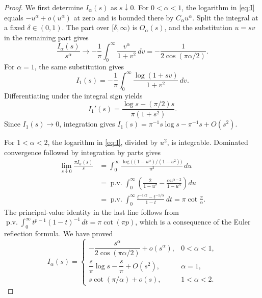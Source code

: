 \documentclass[11pt]{amsart}
\numberwithin{equation}{section}
\theoremstyle{remark}
\newcommand{\pv}{\operatorname{p.v.}}
\begin{document}
\begin{proof}
We first determine $I_\alpha(s)$ as $s\downarrow0$.  For $0<\alpha<1$,
the logarithm in \eqref{eq:I} equals $-u^\alpha+o(u^\alpha)$ at zero and is
bounded there by $C_\alpha u^\alpha$.  Split the integral at a fixed
$\delta\in(0,1)$.  The part over $[\delta,\infty)$ is $O_\alpha(s)$, and the
substitution $u=sv$ in the remaining part gives
\[
 \frac{I_\alpha(s)}{s^\alpha}\longrightarrow
 -\frac1\pi\int_0^\infty\frac{v^\alpha}{1+v^2}\,dv
 =-\frac1{2\cos(\pi\alpha/2)}.
\]
For $\alpha=1$, the same substitution gives
\[
 I_1(s)=-\frac1\pi\int_0^\infty
 \frac{\log(1+sv)}{1+v^2}\,dv.
\]
Differentiating under the integral sign yields
\[
 I_1'(s)=\frac{\log s-(\pi/2)s}{\pi(1+s^2)}.
\]
Since $I_1(s)\to0$, integration gives
$I_1(s)=\pi^{-1}s\log s-\pi^{-1}s+O(s^2)$.

For $1<\alpha<2$, the logarithm in \eqref{eq:I}, divided by $u^2$, is
integrable.  Dominated convergence followed by integration by parts gives
\begin{align*}
 \lim_{s\downarrow0}\frac{\pi I_\alpha(s)}s
 &=\int_0^\infty
 \frac{\log\!\bigl((1-u^\alpha)/(1-u^2)\bigr)}{u^2}\,du\\
 &=\pv\int_0^\infty
 \left(\frac{2}{1-u^2}
 -\frac{\alpha u^{\alpha-2}}{1-u^\alpha}\right)du\\
 &=\pv\int_0^\infty\frac{t^{-1/2}-t^{-1/\alpha}}{1-t}\,dt
 =\pi\cot\frac{\pi}{\alpha}.
\end{align*}
The principal-value identity in the last line follows from
$\pv\int_0^\infty t^{p-1}(1-t)^{-1}\,dt=\pi\cot(\pi p)$, which is a
consequence of the Euler reflection formula.  We have proved
\[
 I_\alpha(s)=
 \begin{cases}
 -\dfrac{s^\alpha}{2\cos(\pi\alpha/2)}+o(s^\alpha),&0<\alpha<1,\\[2mm]
 \dfrac{s}{\pi}\log s-\dfrac{s}{\pi}+O(s^2),&\alpha=1,\\[2mm]
 s\cot(\pi/\alpha)+o(s),&1<\alpha<2.
 \end{cases}
\]


\end{proof}
\end{document}
